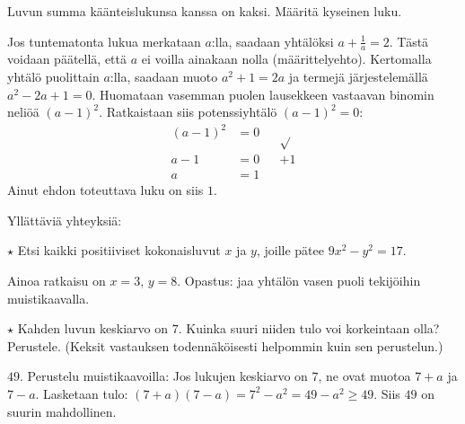 \begin{tehtavasivu}
\begin{tehtava}
Luvun summa käänteislukunsa kanssa on kaksi. Määritä kyseinen luku.
	\begin{vastaus}
	Jos tuntematonta lukua merkataan $a$:lla, saadaan yhtälöksi $a+\frac{1}{a}=2$. Tästä voidaan päätellä, että $a$ ei voilla ainakaan nolla (määrittelyehto). Kertomalla yhtälö puolittain $a$:lla, saadaan muoto $a^2+1=2a$ ja termejä järjestelemällä $a^2-2a+1=0$. Huomataan vasemman puolen lausekkeen vastaavan binomin neliöä $(a-1)^2$. Ratkaistaan siis potenssiyhtälö $(a-1)^2=0$:
	\begin{align*}
(a-1)^2&=0 &&\sqrt{ } \\
a-1&=0 &&+1 \\
a&=1 &&
	\end{align*}
	Ainut ehdon toteuttava luku on siis $1$.
	\end{vastaus}
\end{tehtava}

\begin{tehtava} 
	Yllättäviä yhteyksiä:

    \begin{vastaus}
    \end{vastaus}
\end{tehtava}

\begin{tehtava}
    $\star$ Etsi kaikki positiiviset kokonaisluvut $x$ ja $y$, joille pätee $9x^2-y^2=17$.
    \begin{vastaus}
    Ainoa ratkaisu on $x = 3$, $y=8$. Opastus: jaa yhtälön vasen puoli tekijöihin muistikaavalla. 
    \end{vastaus}
\end{tehtava}

\begin{tehtava}
    $\star$ Kahden luvun keskiarvo on $7$. Kuinka suuri niiden tulo voi korkeintaan olla? Perustele. (Keksit vastauksen todennäköisesti helpommin kuin sen perustelun.)
    \begin{vastaus}
        $49$. Perustelu muistikaavoilla: Jos lukujen keskiarvo on $7$, ne ovat muotoa $7+a$ ja $7-a$. Lasketaan tulo: $(7+a)(7-a)=7^2-a^2 = 49-a^2 \geq 49$. Siis $49$ on suurin mahdollinen.
    \end{vastaus}
\end{tehtava}

\end{tehtavasivu}